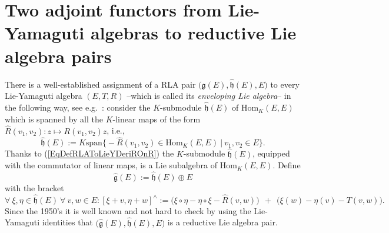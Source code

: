 \documentclass [11pt] {article}
\theoremstyle{definition}
\begin{document}
\section{Two adjoint functors from Lie-Yamaguti algebras to
	  reductive Lie algebra pairs}

There is a well-established assignment of a RLA pair  
$\big(\hat{\mathfrak{g}}(E), \hat{\mathfrak{h}}(E),E\big)$ to every Lie-Yamaguti algebra $(E,T,R)$ --which is called its
\textit{enveloping Lie algebra}--
in the following way, see e.g.~\cite[p.~158, Prop.~2.1]{Yam58}: consider the $K$-submodule $\hat{\mathfrak{h}}(E)$ of
$\mathrm{Hom}_K(E,E)$ which is spanned by
all the $K$-linear maps of the form 
$\hat{R}(v_1,v_2):z\mapsto R(v_1,v_2)z$, i.e.,
\begin{equation}\label{EqDefHatHOfE}
\hat{\mathfrak{h}}(E):=K\mathrm{span}	
       \big\{ -\hat{R}(v_1,v_2)\in\mathrm{Hom}_K(E,E)~\big|~
                   v_1,v_2\in E\big\}.
\end{equation}
Thanks to (\ref{EqDefRLAToLieYDeriROnR}) the $K$-submodule $\hat{\mathfrak{h}}(E)$, equipped with the commutator of linear maps, is a Lie subalgebra
of $\mathrm{Hom}_K(E,E)$. Define 
\begin{equation}\label{EqDefEnvelLieAlg}
   \hat{\mathfrak{g}}(E):= \hat{\mathfrak{h}}(E)\oplus E
\end{equation}
with the bracket 
\begin{equation}\label{EqDefEnvelLieAlgBracket}
	\forall~\xi,\eta\in \hat{\mathfrak{h}}(E)~\forall~v,w\in E:
	[\xi+v,\eta+w]^\wedge:=\big(\xi\circ \eta-\eta\circ\xi-\hat{R}(v,w)\big)
	                ~~+~~\big(\xi(w)-\eta(v)-T(v,w)\big).
\end{equation}
Since the 1950's it is well known and not hard to check by using the Lie-Yamaguti identities that $\big(\hat{\mathfrak{g}}(E),\hat{\mathfrak{h}}(E),E\big)$ is a reductive Lie algebra pair.\\
\end{document}
